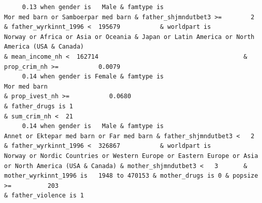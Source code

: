 \documentclass[
  letterpaper,
  DIV=11,
  numbers=noendperiod]{scrreprt}
\begin{document}
\begin{verbatim}
     0.13 when gender is   Male & famtype is                              Mor med barn or Samboerpar med barn & father_shjmndutbet3 >=        2 & father_wyrkinnt_1996 <  195679           & worldpart is                                        Norway or Africa or Asia or Oceania & Japan or Latin America or North America (USA & Canada)                                                                                                                                                          & mean_income_nh <  162714                                        & prop_crim_nh >=           0.0079                                                                                                                                                                                                                                                                            
     0.14 when gender is Female & famtype is                                                     Mor med barn                                                                                                                                                                                                                                                                                                                                                                                                                                                                                               & prop_ivest_nh >=           0.0680                                                                                                                          & father_drugs is 1                                                                        & sum_crim_nh <  21
     0.14 when gender is   Male & famtype is                        Annet or Ektepar med barn or Far med barn & father_shjmndutbet3 <   2       & father_wyrkinnt_1996 <  326867           & worldpart is                              Norway or Nordic Countries or Western Europe or Eastern Europe or Asia or North America (USA & Canada) & mother_shjmndutbet3 <   3       & mother_wyrkinnt_1996 is   1948 to 470153 & mother_drugs is 0 & popsize >=          203                                                                                                                                                                                                                                                                          & father_violence is 1                                                                                                               

\end{verbatim}
\end{document}
